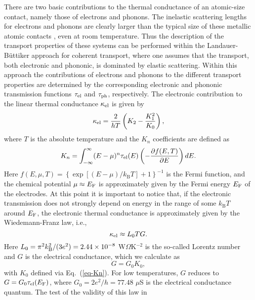 \documentclass[aps,amsmath,amssymb,twocolumn,showpacs]{revtex4-1}
\begin{document}
There are two basic contributions to the thermal conductance of an atomic-size
contact, namely those of electrons and phonons. The inelastic scattering
lengths for electrons and phonons are clearly larger than the typical size of
these metallic atomic contacts \cite{Ashcroft1976}, even at room
temperature. Thus the description of the transport properties of these systems
can be performed within the Landauer-B\"uttiker approach for coherent
transport, where one assumes that the transport, both electronic and phononic,
is dominated by elastic scattering. Within this approach the contributions of
electrons and phonons to the different transport properties are determined by
the corresponding electronic and phononic transmission functions $\tau_{\rm
  el}$ and $\tau_{\rm ph}$, respectively. The electronic contribution to the
linear thermal conductance $\kappa_{\rm el}$ is given by
\cite{Cuevas2017,Sivan1986}
%
\begin{equation}
\kappa_{\rm el} = \frac{2}{hT} \left( K_{2}- \frac{K_{1}^{2}}{K_{0}}\right), 
\label{eq-kel}
\end{equation}
%
where $T$ is the absolute temperature and the $K_n$ coefficients are defined as
%
\begin{equation}
K_n = \int^{\infty}_{-\infty} (E-\mu)^{n} \tau_{\rm el}(E) \left(-\frac{\partial f(E,T)}
{\partial E}\right) dE.
  \label{eq-Kn}
\end{equation}
%
Here $f(E,\mu,T) = \left\{ \exp[(E-\mu)/k_{\mathrm{B}}T]+1\right\} ^{-1}$ is
the Fermi function, and the chemical potential $\mu\approx E_{\textnormal{F}}$
is approximately given by the Fermi energy $E_{\rm F}$ of the electrodes. At
this point it is important to notice that, if the electronic transmission does
not strongly depend on energy in the range of some $k_{\text{B}}T$ around
$E_{\rm F}$, the electronic thermal conductance is approximately given by the
Wiedemann-Franz law, i.e.,
%
\begin{equation}
\kappa_{\rm el} \approx L_0 T G.
\label{eq-WF-law}
\end{equation}
%
Here $L_0 = \pi^2 k^2_{\rm B}/(3e^2) = 2.44 \times 10^{-8}$ W$\Omega$K$^{-2}$
is the so-called Lorentz number and $G$ is the electrical conductance, which
we calculate as \cite{Cuevas2017}
%
\begin{equation}
  G = G_0 K_0,
\end{equation}
%
 with $K_0$ defined via Eq.~(\ref{eq-Kn}). For low temperatures, $G$ reduces
 to $G = G_0 \tau_{\rm el}(E_{\rm F})$, where $G_0 = 2e^2/h = 77.48$ $\mu$S is
 the electrical conductance quantum. The test of the validity of this law in
\end{document}
